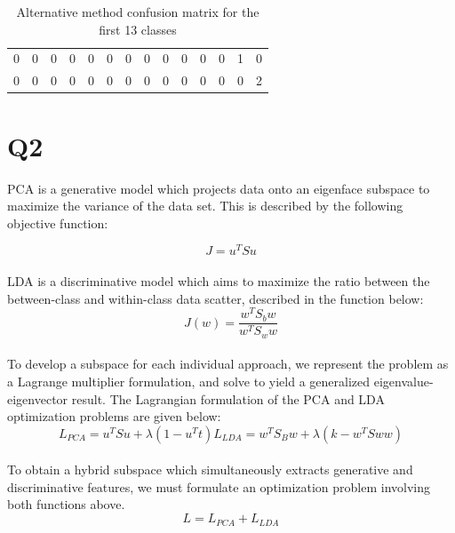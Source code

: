 \documentclass[10pt,twocolumn,letterpaper]{article}
\begin{document}
\begin{table}[h]
\begin{tabular}{llllllllllllll}
0                         & 0                         & 0                         & 0                         & 0                         & 0                         & 0                         & 0                         & 0                         & 0                         & 0                         & 0                         & \cellcolor[HTML]{9AFF99}1 & 0                         \\
0                         & 0                         & 0                         & 0                         & 0                         & 0                         & 0                         & 0                         & 0                         & 0                         & 0                         & 0                         & 0                         & \cellcolor[HTML]{9AFF99}2
\end{tabular}
    \caption{Alternative method confusion matrix for the first 13 classes}
    \label{tab:AM_confusion_matrix}
\end{table}

\section{Q2}

PCA is a generative model which projects data onto an eigenface subspace to maximize the variance of the data set. This is described by the following objective function: 

\begin{equation}
	J = u^TSu
\end{equation}
\\LDA is a discriminative model which aims to maximize the ratio between the between-class and within-class data scatter, described in the function below: 
\begin{equation}
	J(w) = \frac{w^TS_bw}{w^TS_ww}
\end{equation}
\\To develop a subspace for each individual approach, we represent the problem as a Lagrange multiplier formulation, and solve to yield a generalized eigenvalue-eigenvector result. The Lagrangian formulation of the PCA and LDA optimization problems are given below:
\begin{equation}
 
	L_{PCA}=u^TSu +\lambda (1-u^Tt)
	L_{LDA} = w^TS_Bw+\lambda (k-w^TSww)
\end{equation}
\\To obtain a hybrid subspace which simultaneously extracts generative and discriminative features, we must formulate an optimization problem involving both functions above.
\begin{equation}
L=L_{PCA} + L_{LDA}
\end{equation}
\end{document}
